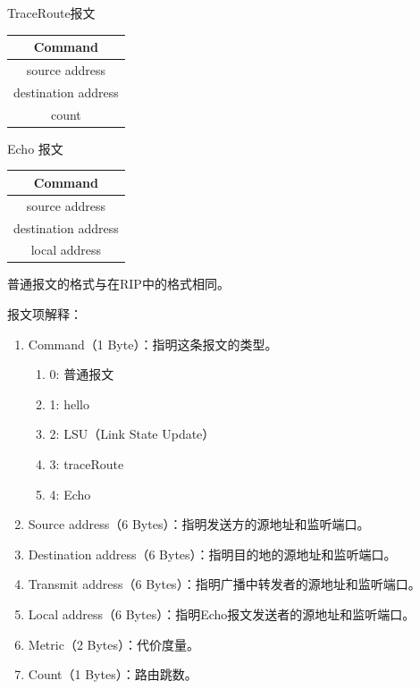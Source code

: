 TraceRoute报文
\begin{table}[H]
	\centering
	\begin{tabular}{|c|}
		\hline              
		Command             \\
		\hline              
		source address      \\
		\hline              
		destination address \\
		\hline              
		count               \\
		\hline              
	\end{tabular}		
\end{table}	

Echo 报文
\begin{table}[H]
	\centering
	\begin{tabular}{|c|}
		\hline              
		Command             \\
		\hline              
		source address      \\
		\hline              
		destination address \\
		\hline              
		local address       \\
		\hline              
	\end{tabular}		
\end{table}
普通报文的格式与在RIP中的格式相同。
\newpage
\par 报文项解释：
\begin{enumerate}[(1)]
	\item Command（1 Byte）：指明这条报文的类型。
	      \begin{enumerate}[]
	      	\item 0: 普通报文
	      	\item 1: hello
	      	\item 2: LSU（Link State Update）
	      	\item 3: traceRoute
	      	\item 4: Echo
	      \end{enumerate}
	\item Source address（6 Bytes）：指明发送方的源地址和监听端口。
	\item Destination address（6 Bytes）：指明目的地的源地址和监听端口。
	\item Transmit address（6 Bytes）：指明广播中转发者的源地址和监听端口。
	\item Local address（6 Bytes）：指明Echo报文发送者的源地址和监听端口。
	\item Metric（2 Bytes）：代价度量。
	\item Count（1 Bytes）：路由跳数。
	\end{enumerate}
	
